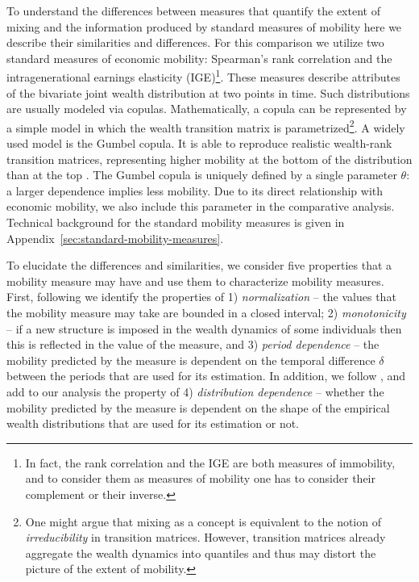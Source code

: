 \documentclass[11pt]{article}
\newcommand{\ie}{{\it i.e.}\xspace}
\numberwithin{equation}{section}
\begin{document}
To understand the differences between measures that quantify the extent of mixing and the information produced by standard measures of mobility here we describe their similarities and differences. For this comparison we utilize two standard measures of economic mobility: Spearman's rank correlation and the intragenerational earnings elasticity (IGE)\footnote{In fact, the rank correlation and the IGE are both measures of immobility, and to consider them as measures of mobility one has to consider their complement or their inverse.}. These measures describe attributes of the bivariate joint wealth distribution at two points in time. Such distributions are usually modeled via copulas. Mathematically, a copula can be represented by a simple model in which the wealth transition matrix is parametrized\footnote{One might argue that mixing as a concept is equivalent to the notion of \textit{irreducibility} in transition matrices. However, transition matrices already aggregate the wealth dynamics into quantiles and thus may distort the picture of the extent of mobility.}. A widely used model is the Gumbel copula. It is able to reproduce realistic wealth-rank transition matrices, representing higher mobility at the bottom of the distribution than at the top \citep{JanttiJenkins2015}. The Gumbel copula is uniquely defined by a single parameter $\theta$: a larger dependence implies less mobility. Due to its direct relationship with economic mobility, we also include this parameter in the comparative analysis. Technical background for the standard mobility measures is given in Appendix~\ref{sec:standard-mobility-measures}.

To elucidate the differences and similarities, we consider five properties that a mobility measure may have and use them to characterize mobility measures. First, following \citet{Shorrocks1978} we identify the properties of 1) \textit{normalization} -- the values that the mobility measure may take are bounded in a closed interval; 2) \textit{monotonicity} -- if a new structure is imposed in the wealth dynamics of some individuals then this is reflected in the value of the measure, and 3) \textit{period dependence} -- the mobility predicted by the measure is dependent on the temporal difference $\delta$ between the periods that are used for its estimation. In addition, we follow \citet{cowell2018measuring}, and add to our analysis the property of 4) \textit{distribution dependence} -- whether the mobility predicted by the measure is dependent on the shape of the empirical wealth distributions that are used for its estimation or not. %
\end{document}
